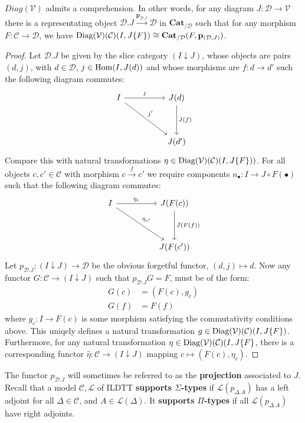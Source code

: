 \begin{thm}
$Diag(\mathcal{V})$ admits a comprehension. In other words, for any diagram $J : \mathcal{D} \to \mathcal{V}$ there is a representating object $\mathcal{D}.J \xrightarrow{\mathbf{p}_{\mathcal{D}.J}} \mathcal{D}$ in $\mathbf{Cat}_{/\mathcal{D}}$ such that for any morphism $F : \mathcal{C} \to \mathcal{D}$, we have $\operatorname{\text{Diag}}(\mathcal{V})(\mathcal{C})(I, J\{F\}) \cong \mathbf{Cat}_{/\mathcal{D}}(F, \mathbf{p}_{(\mathcal{D}, J)})$.
\begin{proof}
Let $\mathcal{D}.J$ be given by the slice category $(I \downarrow J)$, whose objects are pairs $(d, j)$, with $d \in \mathcal{D}$, $j \in \operatorname{\text{Hom}}(I,J(d))$ and whose morphisms are $f : d \to d'$ such the following diagram commutes:
\[
\ti
I \ar[r, "j"] \ar[rd, "j'"] & J(d) \ar[d,"J(f)"]\\
& J(d')
\kz
\]
Compare this with natural transformations $\eta \in \operatorname{\text{Diag}}(\mathcal{V})(\mathcal{C})(I, J\{F\}))$. For all objects $c, c' \in \mathcal{C}$ with morphism $c \xrightarrow{f} c'$ we require components $n_{\bullet} : I \to J \circ F(\bullet)$ such that the following diagram commutes:
\[
\ti
I \ar[r, "\eta_c"] \ar[rd, "\eta_{c'}"] & J(F(c)) \ar[d,"J(F(f))"]\\
& J(F(c'))
\kz
\]
Let $p_{\mathcal{D}.J} : (I \downarrow J) \to \mathcal{D}$ be the obvious forgetful functor, $(d, j) \mapsto d$. Now any functor $G : \mathcal{C} \to (I \downarrow J)$ such that $p_{\mathcal{D}.J}G = F$, must be of the form:
\[
\begin{split}
G(c) &= (F(c), g_c)\\
G(f) &= F(f)
\end{split}
\]
where $g_c : I \to F(c)$ is some morphism satisfying the commutativity conditions above. This uniqely defines a natural transformation $g \in \operatorname{\text{Diag}}(\mathcal{V})(\mathcal{C})(I, J\{F\})$. Furthermore, for any natural transformation $\eta \in \operatorname{\text{Diag}}(\mathcal{V})(\mathcal{C})(I, J\{F\}$, there is a corresponding functor $\hat \eta : \mathcal{C} \to (I \downarrow J)$ mapping $c \mapsto (F(c), \eta_c)$.
\end{proof}
\end{thm}
The functor $p_{\mathcal{D}.J}$ will sometimes be referred to as the \textbf{projection} associated to $J$.
Recall that a model $\mathcal{C}, \mathcal{L}$ of ILDTT \textbf{supports $\Sigma$-types} if $\mathcal{L}(p_{\Delta.A})$ has a left adjoint for all $\Delta \in \mathcal{C}$, and $A \in \mathcal{L}(\Delta)$. It \textbf{supports $\Pi$-types} if all $\mathcal{L}(p_{\Delta.A})$ have right adjoints.
